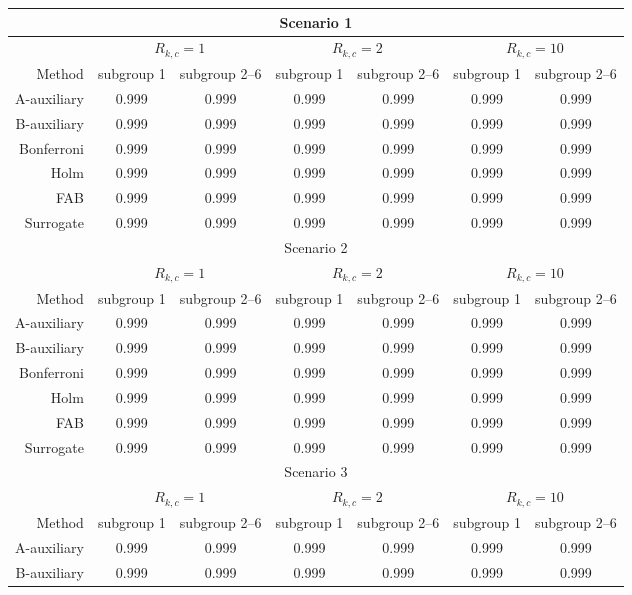 \begin{tabular}{rcccccc} 
\toprule 
\multicolumn{7}{c}{Scenario 1}\\ 
\midrule 
& \multicolumn{2}{c}{$ R_{k,c}= 1$} & \multicolumn{2}{c}{$R_{k,c} = 2$} & \multicolumn{2}{c}{$R_{k,c} = 10$} \\ 
Method  & subgroup 1 & subgroup 2--6 & subgroup 1 & subgroup 2--6 & subgroup 1 & subgroup 2--6 \\ 
A-auxiliary &0.999 & 0.999 &0.999 & 0.999 &0.999 & 0.999 \\ 
B-auxiliary &0.999 & 0.999 &0.999 & 0.999 &0.999 & 0.999 \\ 
Bonferroni &0.999 & 0.999 &0.999 & 0.999 &0.999 & 0.999 \\ 
Holm &0.999 & 0.999 &0.999 & 0.999 &0.999 & 0.999 \\ 
FAB &0.999 & 0.999 &0.999 & 0.999 &0.999 & 0.999 \\ 
Surrogate &0.999 & 0.999 &0.999 & 0.999 &0.999 & 0.999 \\ 
\bottomrule 
\multicolumn{7}{c}{Scenario 2}\\ 
\midrule 
& \multicolumn{2}{c}{$ R_{k,c} = 1$} & \multicolumn{2}{c}{$ R_{k,c} = 2$} & \multicolumn{2}{c}{$ R_{k,c} = 10$} \\Method  & subgroup 1 & subgroup 2--6 & subgroup 1 & subgroup 2--6 & subgroup 1 & subgroup 2--6 \\ 
A-auxiliary &0.999 & 0.999 &0.999 & 0.999 &0.999 & 0.999 \\ 
B-auxiliary &0.999 & 0.999 &0.999 & 0.999 &0.999 & 0.999 \\ 
Bonferroni &0.999 & 0.999 &0.999 & 0.999 &0.999 & 0.999 \\ 
Holm &0.999 & 0.999 &0.999 & 0.999 &0.999 & 0.999 \\ 
FAB &0.999 & 0.999 &0.999 & 0.999 &0.999 & 0.999 \\ 
Surrogate &0.999 & 0.999 &0.999 & 0.999 &0.999 & 0.999 \\ 
\bottomrule 
\multicolumn{7}{c}{Scenario 3}\\ 
\midrule 
& \multicolumn{2}{c}{$ R_{k,c} = 1$} & \multicolumn{2}{c}{$R_{k,c} = 2$} & \multicolumn{2}{c}{$R_{k,c} = 10$} \\ 
Method  & subgroup 1 & subgroup 2--6 & subgroup 1 & subgroup 2--6 & subgroup 1 & subgroup 2--6 \\ 
A-auxiliary &0.999 & 0.999 &0.999 & 0.999 &0.999 & 0.999 \\ 
 B-auxiliary &0.999 & 0.999 &0.999 & 0.999 &0.999 & 0.999 \\ 

\end{tabular}
